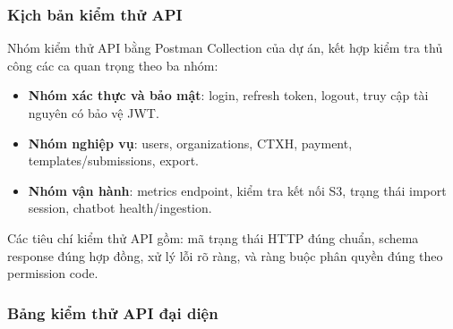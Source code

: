 \subsubsection{Kịch bản kiểm thử API}
Nhóm kiểm thử API bằng Postman Collection của dự án, kết hợp kiểm tra thủ công các ca quan trọng theo ba nhóm:
\begin{itemize}
	\item \textbf{Nhóm xác thực và bảo mật}: login, refresh token, logout, truy cập tài nguyên có bảo vệ JWT.
	\item \textbf{Nhóm nghiệp vụ}: users, organizations, CTXH, payment, templates/submissions, export.
	\item \textbf{Nhóm vận hành}: metrics endpoint, kiểm tra kết nối S3, trạng thái import session, chatbot health/ingestion.
\end{itemize}

Các tiêu chí kiểm thử API gồm: mã trạng thái HTTP đúng chuẩn, schema response đúng hợp đồng, xử lý lỗi rõ ràng, và ràng buộc phân quyền đúng theo permission code.

\subsubsection{Bảng kiểm thử API đại diện}

